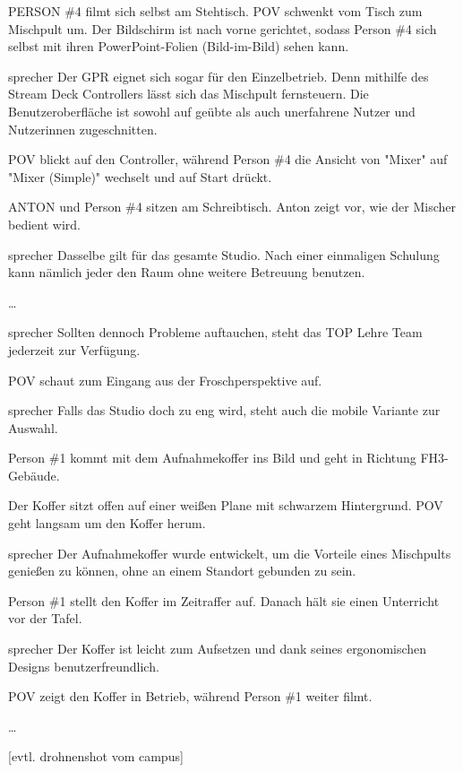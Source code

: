 \documentclass{screenplay}
\begin{document}
	PERSON \#4 filmt sich selbst am Stehtisch. POV schwenkt vom Tisch zum Mischpult um. Der Bildschirm ist nach vorne gerichtet, sodass Person \#4 sich selbst mit ihren PowerPoint-Folien (Bild-im-Bild) sehen kann.
	
	\begin{dialogue}{sprecher}
		Der GPR eignet sich sogar für den Einzelbetrieb. Denn mithilfe des Stream Deck Controllers lässt sich das Mischpult fernsteuern. Die Benutzeroberfläche ist sowohl auf geübte als auch unerfahrene Nutzer und Nutzerinnen zugeschnitten.
	\end{dialogue}
	
	POV blickt auf den Controller, während Person \#4 die Ansicht von "Mixer" auf "Mixer (Simple)" wechselt und auf Start drückt.
	
	ANTON und Person \#4 sitzen am Schreibtisch. Anton zeigt vor, wie der Mischer bedient wird.
	
	\begin{dialogue}{sprecher}
		Dasselbe gilt für das gesamte Studio. Nach einer einmaligen Schulung kann nämlich jeder den Raum ohne weitere Betreuung benutzen.
	\end{dialogue}
	
	\dots
	
	\begin{dialogue}{sprecher}
		Sollten dennoch Probleme auftauchen, steht das TOP Lehre Team jederzeit zur Verfügung.
	\end{dialogue}
	
	
	POV schaut zum Eingang aus der Froschperspektive auf.
	
	\begin{dialogue}[ironisch]{sprecher}
		Falls das Studio doch zu eng wird, steht auch die mobile Variante zur Auswahl.
	\end{dialogue}
	
	Person \#1 kommt mit dem Aufnahmekoffer ins Bild und geht in Richtung FH3-Gebäude.
	
	
	Der Koffer sitzt offen auf einer weißen Plane mit schwarzem Hintergrund. POV geht langsam um den Koffer herum.
	
	\begin{dialogue}{sprecher}
		Der Aufnahmekoffer wurde entwickelt, um die Vorteile eines Mischpults genießen zu können, ohne an einem Standort gebunden zu sein.
	\end{dialogue}
	
	
	Person \#1 stellt den Koffer im Zeitraffer auf. Danach hält sie einen Unterricht vor der Tafel.
	
	\begin{dialogue}{sprecher}
		Der Koffer ist leicht zum Aufsetzen und dank seines ergonomischen Designs benutzerfreundlich.
	\end{dialogue}
	
	POV zeigt den Koffer in Betrieb, während Person \#1 weiter filmt.
	
	\dots
	
	[evtl. drohnenshot vom campus]
	
	\fadeout
	\theend
\end{document}
